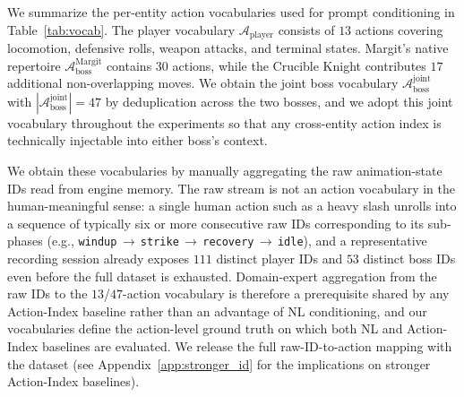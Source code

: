 We summarize the per-entity action vocabularies used for prompt conditioning in Table~\ref{tab:vocab}. The player vocabulary $\mathcal{A}_{\text{player}}$ consists of $13$ actions covering locomotion, defensive rolls, weapon attacks, and terminal states. Margit's native repertoire $\mathcal{A}_{\text{boss}}^{\text{Margit}}$ contains $30$ actions, while the Crucible Knight contributes $17$ additional non-overlapping moves. We obtain the joint boss vocabulary $\mathcal{A}_{\text{boss}}^{\text{joint}}$ with $|\mathcal{A}_{\text{boss}}^{\text{joint}}|=47$ by deduplication across the two bosses, and we adopt this joint vocabulary throughout the experiments so that any cross-entity action index is technically injectable into either boss's context.

We obtain these vocabularies by manually aggregating the raw animation-state IDs read from engine memory. The raw stream is not an action vocabulary in the human-meaningful sense: a single human action such as a heavy slash unrolls into a sequence of typically six or more consecutive raw IDs corresponding to its sub-phases (e.g., \texttt{windup}\,$\to$\,\texttt{strike}\,$\to$\,\texttt{recovery}\,$\to$\,\texttt{idle}), and a representative recording session already exposes $111$ distinct player IDs and $53$ distinct boss IDs even before the full dataset is exhausted. Domain-expert aggregation from the raw IDs to the $13$/$47$-action vocabulary is therefore a prerequisite shared by any Action-Index baseline rather than an advantage of NL conditioning, and our vocabularies define the action-level ground truth on which both NL and Action-Index baselines are evaluated. We release the full raw-ID-to-action mapping with the dataset (see Appendix~\ref{app:stronger_id} for the implications on stronger Action-Index baselines).

